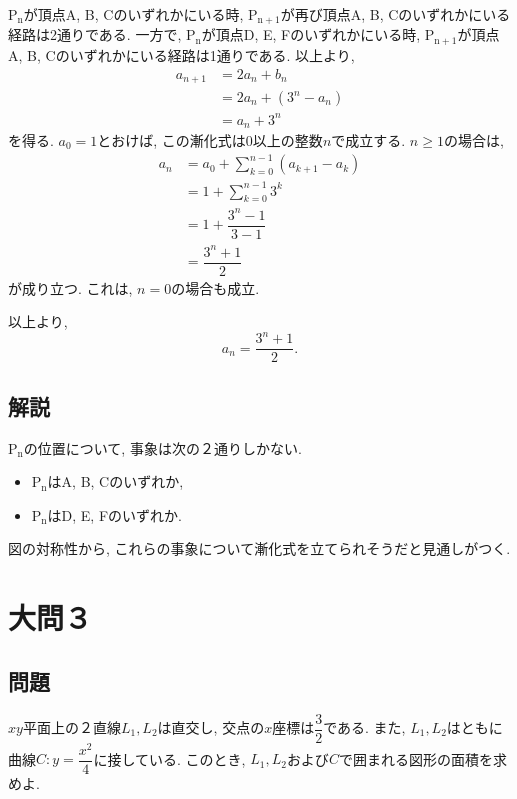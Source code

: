 \documentclass[dvipdfmx,a4paper]{jsarticle}
\newcommand{\2}{I\hspace{-1pt}I}
\newcommand{\3}{I\hspace{-1pt}I\hspace{-1pt}I}
\begin{document}
    $\mathrm{P_n}$が頂点A, B, Cのいずれかにいる時, 
    $\mathrm{P_{n+1}}$が再び頂点A, B, Cのいずれかにいる経路は2通りである. 
    一方で, $\mathrm{P_n}$が頂点D, E, Fのいずれかにいる時, 
    $\mathrm{P_{n+1}}$が頂点A, B, Cのいずれかにいる経路は1通りである. 
    以上より, 
    \begin{align*}
        a_{n+1} &= 2a_n + b_n \\
                &= 2a_n + (3^n-a_n) \\
                &= a_n + 3^n
    \end{align*}
    を得る. $a_0=1$とおけば, この漸化式は0以上の整数$n$で成立する. 
    $n \geq 1$の場合は, 
    \begin{align*}\displaystyle
        a_n &= a_0 + \sum_{k=0}^{n-1} (a_{k+1} - a_k) \\
            &= 1 + \sum_{k=0}^{n-1} 3^k \\
            &= 1 + \dfrac{3^n-1}{3-1} \\
            &= \dfrac{3^n+1}{2}
    \end{align*}
    が成り立つ. これは, $n=0$の場合も成立. 

    以上より, 
    \begin{equation*}
        a_n = \dfrac{3^n+1}{2}.
    \end{equation*}
    

    \subsection{解説}
    $\mathrm{P_n}$の位置について, 事象は次の２通りしかない. 
    \begin{itemize}
        \item $\mathrm{P_n}$はA, B, Cのいずれか, 
        \item $\mathrm{P_n}$はD, E, Fのいずれか. 
    \end{itemize}
    図の対称性から, これらの事象について漸化式を立てられそうだと見通しがつく. 


    \section{大問３}
    \subsection{問題}
    $xy$平面上の２直線$L_1, L_2$は直交し, 交点の$x$座標は$\dfrac{3}{2}$である. また, 
    $L_1, L_2$はともに曲線$C: y = \dfrac{x^2}{4}$に接している. 
    このとき, $L_1, L_2$および$C$で囲まれる図形の面積を求めよ. 
\end{document}

